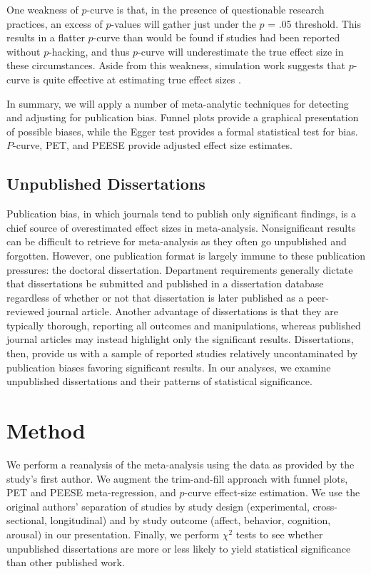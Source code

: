 \documentclass[man]{apa6}
\begin{document}
One weakness of $p$-curve is that, in the presence of questionable research practices, an excess of $p$-values will gather just under the $p$ = .05 threshold. This results in a flatter $p$-curve than would be found if studies had been reported without $p$-hacking, and thus $p$-curve will underestimate the true effect size in these circumstances. Aside from this weakness, simulation work suggests that $p$-curve is quite effective at estimating true effect sizes \citep{Simonsohn:etal:2014,Simonsohn:etal:2014b}.

In summary, we will apply a number of meta-analytic techniques for detecting and adjusting for publication bias. Funnel plots provide a graphical presentation of possible biases, while the Egger test provides a formal statistical test for bias. $P$-curve, PET, and PEESE provide adjusted effect size estimates.

\subsection{Unpublished Dissertations}
Publication bias, in which journals tend to publish only significant findings, is a chief source of overestimated effect sizes in meta-analysis. Nonsignificant results can be difficult to retrieve for meta-analysis as they often go unpublished and forgotten. However, one publication format is largely immune to these publication pressures: the doctoral dissertation. Department requirements generally dictate that dissertations be submitted and published in a dissertation database regardless of whether or not that dissertation is later published as a peer-reviewed journal article.  Another advantage of dissertations is that they are typically thorough, reporting all outcomes and manipulations, whereas published journal articles may instead highlight only the significant results.  Dissertations, then, provide us with a sample of reported studies relatively uncontaminated by publication biases favoring significant results. In our analyses, we examine unpublished dissertations and their patterns of statistical significance.

\section{Method}
We perform a reanalysis of the \citet{Anderson:etal:2010} meta-analysis using the data as provided by the study's first author.  We augment the trim-and-fill approach with funnel plots, PET and PEESE meta-regression, and $p$-curve effect-size estimation. We use the original authors' separation of studies by study design (experimental, cross-sectional, longitudinal) and by study outcome (affect, behavior, cognition, arousal) in our presentation. Finally, we perform $\chi^2$ tests to see whether unpublished dissertations are more or less likely to yield statistical significance than other published work.
\end{document}
